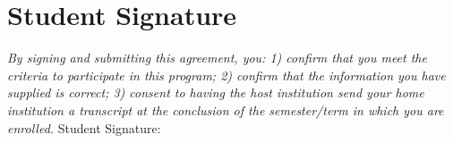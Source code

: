 \documentclass[10pt]{article}
\begin{document}
\section*{Student Signature}
\textit {By signing and submitting this agreement, you: 1) confirm that you meet the criteria to participate in this program; 2) confirm that the information you have supplied is correct; 3) consent to having the host institution send your home institution a transcript at the conclusion of the semester/term in which you are enrolled.}
\newline
Student Signature:
\end{document}
